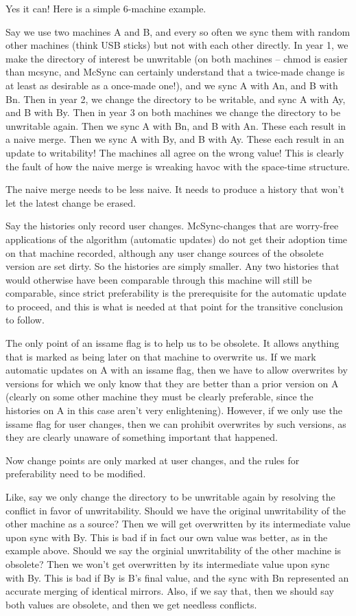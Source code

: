 \documentclass{book}
\begin{document}
Yes it can!  Here is a simple 6-machine example.

Say we use two machines A and B, and every so often we sync them with random other machines (think USB sticks) but not with each other directly.  In year 1, we make the directory of interest be unwritable (on both machines -- chmod is easier than mcsync, and McSync can certainly understand that a twice-made change is at least as desirable as a once-made one!), and we sync A with An, and B with Bn.  Then in year 2, we change the directory to be writable, and sync A with Ay, and B with By.  Then in year 3 on both machines we change the directory to be unwritable again.  Then we sync A with Bn, and B with An.  These each result in a naive merge.  Then we sync A with By, and B with Ay.  These each result in an update to writability!  The machines all agree on the wrong value!  This is clearly the fault of how the naive merge is wreaking havoc with the space-time structure.

The naive merge needs to be less naive.  It needs to produce a history that won't let the latest change be erased.

Say the histories only record user changes.  McSync-changes that are worry-free applications of the algorithm (automatic updates) do not get their adoption time on that machine recorded, although any user change sources of the obsolete version are set dirty.  So the histories are simply smaller.  Any two histories that would otherwise have been comparable through this machine will still be comparable, since strict preferability is the prerequisite for the automatic update to proceed, and this is what is needed at that point for the transitive conclusion to follow.

The only point of an issame flag is to help us to be obsolete.  It allows anything that is marked as being later on that machine to overwrite us.  If we mark automatic updates on A with an issame flag, then we have to allow overwrites by versions for which we only know that they are better than a prior version on A (clearly on some other machine they must be clearly preferable, since the histories on A in this case aren't very enlightening).  However, if we only use the issame flag for user changes, then we can prohibit overwrites by such versions, as they are clearly unaware of something important that happened.

Now change points are only marked at user changes, and the rules for preferability need to be modified.

Like, say we only change the directory to be unwritable again by resolving the conflict in favor of unwritability.
Should we have the original unwritability of the other machine as a source?
    Then we will get overwritten by its intermediate value upon sync with By.
    This is bad if in fact our own value was better, as in the example above.
Should we say the orginial unwritability of the other machine is obsolete?
    Then we won't get overwritten by its intermediate value upon sync with By.
    This is bad if By is B's final value, and the sync with Bn represented an accurate merging of identical mirrors.
    Also, if we say that, then we should say both values are obsolete, and then we get needless conflicts.
\end{document}
